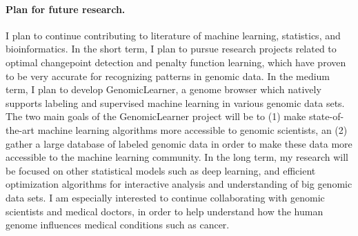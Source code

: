\documentclass{article}
\begin{document}
\paragraph{Plan for future research.} I plan to continue contributing
to literature of machine learning, statistics, and bioinformatics. In
the short term, I plan to pursue research projects related to optimal
changepoint detection and penalty function learning, which have proven
to be very accurate for recognizing patterns in genomic data. In the
medium term, I plan to develop GenomicLearner, a genome browser which
natively supports labeling and supervised machine learning in various
genomic data sets. The two main goals of the GenomicLearner project
will be to (1) make state-of-the-art machine learning algorithms more
accessible to genomic scientists, an (2) gather a large database of
labeled genomic data in order to make these data more accessible to
the machine learning community. In the long term, my research will be
focused on other statistical models such as deep learning, and
efficient optimization algorithms for interactive analysis and
understanding of big genomic data sets. I am especially interested to
continue collaborating with genomic scientists and medical doctors, in
order to help understand how the human genome influences medical
conditions such as cancer.




\end{document}
